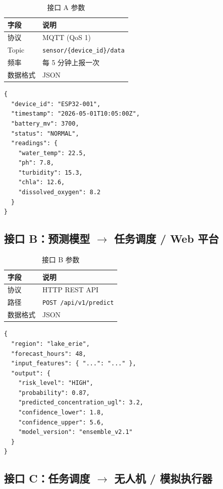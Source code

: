 \documentclass[12pt,a4paper,openany]{ctexrep}
\begin{document}
\begin{table}[htbp]
\centering
\caption{接口 A 参数}
\begin{tabular}{ll}
\toprule
\textbf{字段} & \textbf{说明} \\
\midrule
协议 & MQTT (QoS 1) \\
Topic & \texttt{sensor/\{device\_id\}/data} \\
频率 & 每 5 分钟上报一次 \\
数据格式 & JSON \\
\bottomrule
\end{tabular}
\end{table}

\begin{lstlisting}[language={},title={接口 A 数据示例}]
{
  "device_id": "ESP32-001",
  "timestamp": "2026-05-01T10:05:00Z",
  "battery_mv": 3700,
  "status": "NORMAL",
  "readings": {
    "water_temp": 22.5,
    "ph": 7.8,
    "turbidity": 15.3,
    "chla": 12.6,
    "dissolved_oxygen": 8.2
  }
}
\end{lstlisting}

\subsection{接口 B：预测模型 $\rightarrow$ 任务调度 / Web 平台}

\begin{table}[htbp]
\centering
\caption{接口 B 参数}
\begin{tabular}{ll}
\toprule
\textbf{字段} & \textbf{说明} \\
\midrule
协议 & HTTP REST API \\
路径 & \texttt{POST /api/v1/predict} \\
数据格式 & JSON \\
\bottomrule
\end{tabular}
\end{table}

\begin{lstlisting}[language={},title={接口 B 数据示例}]
{
  "region": "lake_erie",
  "forecast_hours": 48,
  "input_features": { "...": "..." },
  "output": {
    "risk_level": "HIGH",
    "probability": 0.87,
    "predicted_concentration_ugl": 3.2,
    "confidence_lower": 1.8,
    "confidence_upper": 5.6,
    "model_version": "ensemble_v2.1"
  }
}
\end{lstlisting}

\subsection{接口 C：任务调度 $\rightarrow$ 无人机 / 模拟执行器}
\end{document}
